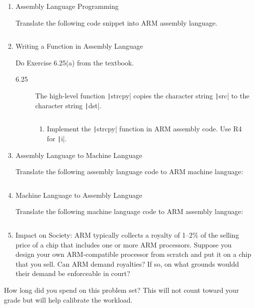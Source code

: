 \documentclass{e85}
\date{2019}
\author{}
\begin{document}
\begin{enumerate}
\item Assembly Language Programming

  Translate the following code snippet into ARM assembly language.

  \inputminted{c}{code/assembly-language-programming.c}

  \begin{solution}
  \end{solution}

\item Writing a Function in Assembly Language

  Do Exercise 6.25(a) from the textbook.
  \begin{description}
  \item[6.25] The high-level function \texttt|strcpy| copies
    the character string \texttt|src| to the character string
    \texttt|dst|.

    \inputminted{c}{code/writing-a-function-in-assembly-language.c}

    \begin{enumerate}[label=(\alph*)]
    \item Implement the \texttt|strcpy| function in ARM
      assembly code.  Use R4 for \texttt|i|.

      \begin{solution}
      \end{solution}
    \end{enumerate}
  \end{description}

\item Assembly Language to Machine Language

  Translate the following assembly language code to ARM machine
  language:

  \inputminted{text}{code/assembly-language-to-machine-language.arm}


  \begin{solution}
  \end{solution}

\item Machine Language to Assembly Language

  Translate the following machine language code to ARM assembly
  language:

  \inputminted{text}{code/machine-language-to-assembly-language}

  \begin{solution}
  \end{solution}

\item Impact on Society: ARM typically collects a royalty of 1--2\% of
  the selling price of a chip that includes one or more ARM
  processors.  Suppose you design your own ARM-compatible processor
  from scratch and put it on a chip that you sell.  Can ARM demand
  royalties?  If so, on what grounds wouldd their demand be
  enforceable in court?

  \begin{solution}
  \end{solution}
\end{enumerate}

How long did you spend on this problem set?  This will not count
toward your grade but will help calibrate the workload.
\begin{solution}
\end{solution}
\end{document}
